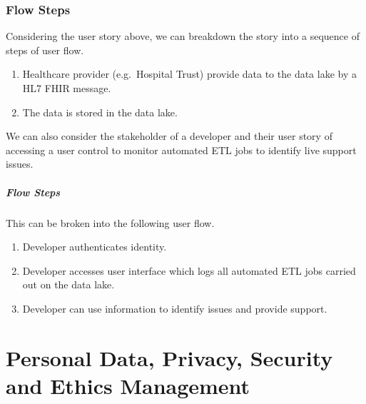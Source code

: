 \documentclass[10pt]{article}
\begin{document}
\subsubsection{Flow Steps}\label{flow-steps-1}

Considering the user story above, we can breakdown the story into a
sequence of steps of user flow.

\begin{enumerate}
\def\labelenumi{\arabic{enumi}.}
\itemsep1pt\parskip0pt
\item
  Healthcare provider (e.g.~Hospital Trust) provide data to the data
  lake by a HL7 FHIR message.
\item
  The data is stored in the data lake.
\end{enumerate}

We can also consider the stakeholder of a developer and their user story	
of accessing a user control to monitor automated ETL jobs to identify	
live support issues.	

\subparagraph{Flow Steps}

This can be broken into the following user flow.	

\begin{enumerate}	
	\def\labelenumi{\arabic{enumi}.}	
	\itemsep1pt\parskip0pt	
	\item	
	Developer authenticates identity.	
	\item	
	Developer accesses user interface which logs all automated ETL jobs	
	carried out on the data lake.	
	\item	
	Developer can use information to identify issues and provide support.	
\end{enumerate}

\section{Personal Data, Privacy, Security and Ethics Management}
\end{document}
